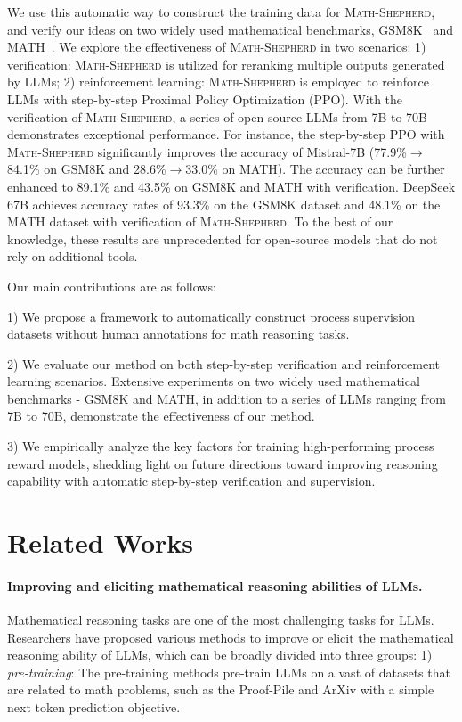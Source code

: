 We use this automatic way to construct the training data for \textsc{Math-Shepherd}, and verify our ideas on two widely used mathematical benchmarks, GSM8K~\citep{cobbe2021training} and MATH~\citep{MATH}. We explore the effectiveness of \textsc{Math-Shepherd} in two scenarios: 1) verification:  \textsc{Math-Shepherd} is utilized for reranking multiple outputs generated by LLMs; 2) reinforcement learning: \textsc{Math-Shepherd} is employed to reinforce LLMs with step-by-step Proximal Policy Optimization (PPO). With the verification of \textsc{Math-Shepherd}, a series of open-source LLMs from 7B to 70B demonstrates exceptional performance. For instance, the step-by-step PPO with \textsc{Math-Shepherd} significantly improves the accuracy of Mistral-7B (77.9\%$\to$84.1\% on GSM8K and 28.6\%$\to$33.0\% on MATH). The accuracy can be further enhanced to 89.1\% and 43.5\% on GSM8K and MATH with verification. DeepSeek 67B \citep{DeepSeek-llm} achieves accuracy rates of 93.3\% on the GSM8K dataset and 48.1\% on the MATH dataset with verification of \textsc{Math-Shepherd}.
To the best of our knowledge, these results are unprecedented for open-source models that do not rely on additional tools.

Our main contributions are as follows: 

1) We propose a framework to automatically construct process supervision datasets without human annotations for math reasoning tasks. 

2) We evaluate our method on both step-by-step verification and reinforcement learning scenarios. Extensive experiments on two widely used mathematical benchmarks - GSM8K and MATH, in addition to a series of LLMs ranging from 7B to 70B, demonstrate the effectiveness of our method.

3) We empirically analyze the key factors for training high-performing process reward models, shedding light on future directions toward improving reasoning capability with automatic step-by-step verification and supervision.

\section{Related Works}
\paragraph{Improving and eliciting mathematical reasoning abilities of LLMs.} Mathematical reasoning tasks are one of the most challenging tasks for LLMs. Researchers have proposed various methods to improve or elicit the mathematical reasoning ability of LLMs, which can be broadly divided into three groups: 1) \textit{pre-training}: The pre-training methods \citep{gpt4,palm,LLaMA,azerbayev2023llemma} pre-train LLMs on a vast of datasets that are related to math problems, such as the Proof-Pile and ArXiv \citep{azerbayev2023llemma} with a simple next token prediction objective. 

